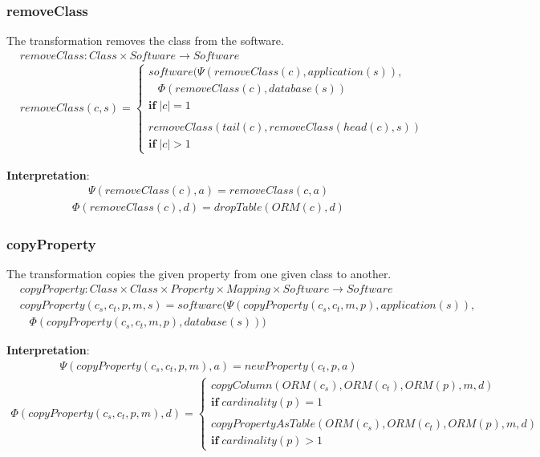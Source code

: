 \documentclass[10pt]{article}
\begin{document}
\subsubsection{removeClass}
The transformation removes the class from the software.
\begin{align}
& removeClass: Class \times Software \rightarrow Software \nonumber \\
& removeClass(c, s) = \begin{cases}
 software(\Psi(removeClass(c), application(s)), \\
\;\;\; \Phi(removeClass(c), database(s)) \\
\mathbf{if} \; |c| = 1 \\\\
 removeClass(tail(c), removeClass(head(c), s)) \\
\mathbf{if} \; |c| > 1
 \end{cases}
\end{align}

\noindent \textbf{Interpretation}:
\begin{align}
\Psi(removeClass(c), a) = removeClass(c, a)
\end{align}
\begin{align}
\Phi(removeClass(c), d) = dropTable(ORM(c), d)
\end{align}

\subsubsection{copyProperty}
The transformation copies the given property from one given class to another.
\begin{align}
& copyProperty: Class \times Class \times Property \times Mapping \times Software \rightarrow Software \\
& copyProperty(c_s, c_t, p, m, s) = software(\Psi(copyProperty(c_s, c_t, m, p), application(s)), \nonumber \\
& \;\;\; \Phi(copyProperty(c_s, c_t, m, p), database(s)))
\end{align}

\noindent \textbf{Interpretation}:
\begin{align}
\Psi(copyProperty(c_s, c_t, p, m), a) = newProperty(c_t, p, a)
\end{align}
\begin{align}
\Phi(copyProperty(c_s, c_t, p, m), d) = \begin{cases}
 copyColumn(ORM(c_s), ORM(c_t), ORM(p), m, d) \\
 \mathbf{if} \; cardinality(p) = 1  \\\\
 copyPropertyAsTable(ORM(c_s), ORM(c_t), ORM(p), m, d) \\ 
 \mathbf{if} \; cardinality(p) > 1
 \end{cases}
\end{align}
\end{document}
